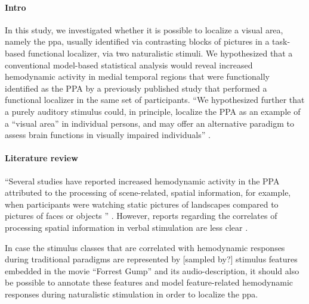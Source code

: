 


\paragraph{Intro}

In this study, we investigated whether it is possible to localize a visual area,
namely the \ac{ppa}, usually identified via contrasting blocks of pictures in a
task-based functional localizer, via two naturalistic stimuli.
We hypothesized that a conventional model-based statistical analysis would
reveal increased hemodynamic activity in medial temporal regions that were
functionally identified as the PPA by a previously published study
\citep{sengupta2016extension} that performed a functional localizer in the same
set of participants.
``We hypothesized further that a purely auditory stimulus could, in principle,
localize the PPA as an example of a ``visual area'' in individual persons,
%
and may offer an alternative paradigm to assess brain functions in visually
impaired individuals'' \citep{haeusler2022processing}.


\paragraph{Literature review}

``Several studies have reported increased hemodynamic activity in the PPA
attributed to the processing of scene-related, spatial information, for example,
when participants were watching static pictures of landscapes compared to
pictures of faces or objects \citep{epstein1998ppa,
epstein1999parahippocampal}'' \citep{haeusler2022processing}.
However, reports regarding the correlates of processing spatial information in
verbal stimulation are less clear \citep{aziz2008modulation}.

In case the stimulus classes that are correlated with hemodynamic responses
during traditional paradigms are represented by [sampled by?] stimulus features
embedded in the movie ``Forrest Gump'' and its audio-description, it should also
be possible to annotate these features and model feature-related hemodynamic
responses during naturalistic stimulation in order to localize the \ac{ppa}.


